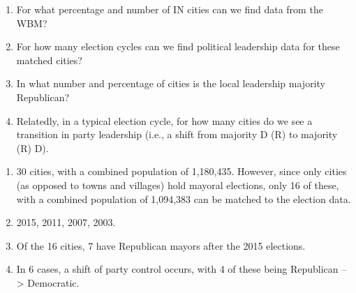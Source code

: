 \documentclass[11pt]{article}
\begin{document}
\begin{enumerate}

\item For what percentage and number of IN cities can we find data from the WBM?
\item For how many election cycles can we find political leadership data for these matched cities?
\item In what number and percentage of cities is the local leadership majority Republican? 
\item Relatedly, in a typical election cycle, for how many cities do we see a transition in party leadership (i.e., a shift from majority D (R) to majority (R) D). 

\end{enumerate}

\begin{enumerate}
	
	\item 30 cities, with a combined population of 1,180,435. However, since only cities (as opposed to towns and villages) hold mayoral elections, only 16 of these, with a combined population of 1,094,383 can be matched to the election data.
	\item 2015, 2011, 2007, 2003.
	\item Of the 16 cities, 7 have Republican mayors after the 2015 elections.
	\item In 6 cases, a shift of party control occurs, with 4 of these being Republican --> Democratic. 
	
\end{enumerate}
\end{document}
